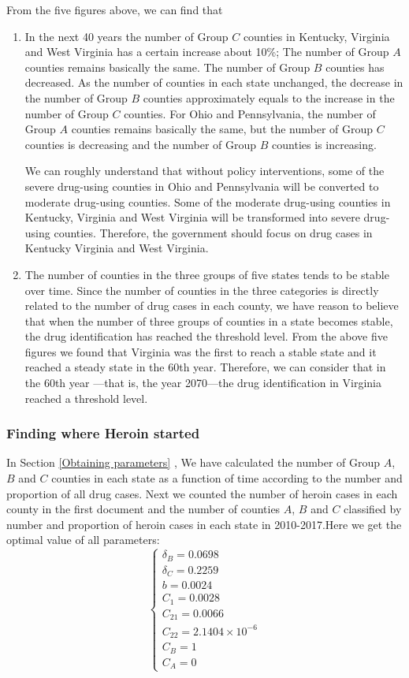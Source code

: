 \documentclass{mcmthesis}
\begin{document}
From the five figures above, we can find that
\begin{enumerate}
  \item In the next 40 years the number of Group $C$ counties in Kentucky, Virginia and West Virginia has a certain increase about 10\%; The number of Group $A$ counties remains basically the same.  The number of Group $B$ counties has decreased. As the number of counties in each state unchanged, the decrease in the number of Group $B$ counties approximately equals to the increase in the number of Group $C$ counties. For Ohio and Pennsylvania, the number of Group $A$ counties remains basically the same, but the number of Group $C$ counties is decreasing and the number of Group $B$ counties is increasing. 

We can roughly understand that without policy interventions, some of the severe drug-using counties in Ohio and Pennsylvania will be converted to moderate drug-using counties. Some of the moderate drug-using counties in Kentucky, Virginia and West Virginia will be transformed into severe drug-using counties. Therefore, the government should focus on drug cases in Kentucky Virginia and West Virginia. 
\item The number of counties in the three groups of five states tends to be stable over time. Since the number of counties in the three categories is directly related to the number of drug cases in each county, we have reason to believe that when the number of three groups of counties in a state becomes stable, the drug identification has reached the threshold level. From the above five figures we found that Virginia was the first to reach a stable state and it reached a steady state in the 60th year. Therefore, we can consider that in the 60th year ---that is, the year 2070---the drug identification in Virginia reached a threshold level.
\end{enumerate}

\subsubsection{Finding where Heroin started}
In Section \ref{Obtaining parameters} , We have calculated the number of Group $A$, $B$ and $C$ counties in each state as a function of time according to the number and proportion of all drug cases.  Next we counted the number of heroin cases in each county in the first document and the number of counties $A$, $B$ and $C$ classified by number and proportion of heroin cases in each state in 2010-2017.Here we get the optimal value of all parameters:
\begin{equation}
	\left\{ \begin{array}{l}
{\delta _B} = 0.0698\\
{\delta _C} = 0.2259\\
b = 0.0024\\
{C_1} = 0.0028\\
{C_{21}} = 0.0066\\
{C_{22}} = 2.1404 \times {10^{ - 6}}\\
{C_B} = 1\\
{C_A} = 0
\end{array} \right.
\end{equation}
\end{document}
